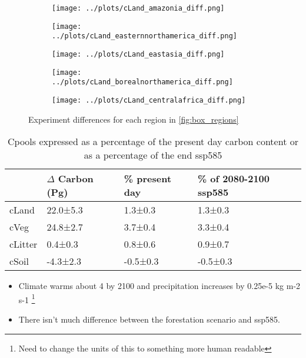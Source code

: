 \documentclass[]{article}
\begin{document}
\begin{figure}[H]
    \centering
    \begin{subfigure}[b]{0.4\linewidth}
        \texttt{[image: ../plots/cLand\_amazonia\_diff.png]}
    \end{subfigure}

    \begin{subfigure}[b]{0.4\linewidth}
        \texttt{[image: ../plots/cLand\_easternnorthamerica\_diff.png]}
    \end{subfigure}
    \begin{subfigure}[b]{0.4\linewidth}
        \texttt{[image: ../plots/cLand\_eastasia\_diff.png]}
    \end{subfigure}
    \begin{subfigure}[b]{0.4\linewidth}
        \texttt{[image: ../plots/cLand\_borealnorthamerica\_diff.png]}
    \end{subfigure}
    \begin{subfigure}[b]{0.4\linewidth}
        \texttt{[image: ../plots/cLand\_centralafrica\_diff.png]}
    \end{subfigure}
    \caption{Experiment differences for each region in \ref{fig:box_regions}}
    \label{fig:aus_region_cveg_tas}
\end{figure}

\begin{table}[H]
    \centering
    \begin{tabular}{@{}llll@{}}
    \hline
        & $\Delta$ Carbon (Pg) & \% present day & \% of 2080-2100 ssp585 \\ \hline
cLand   & 22.0±5.3    & 1.3±0.3        & 1.3±0.3                \\
cVeg    & 24.8±2.7    & 3.7±0.4        & 3.3±0.4                \\
cLitter & 0.4±0.3     & 0.8±0.6        & 0.9±0.7                \\
cSoil   & -4.3±2.3    & -0.5±0.3       & -0.5±0.3               \\ \hline
    \end{tabular}
    \caption{Cpools expressed as a percentage of the present day carbon content or  as a percentage of the end  ssp585}
    \label{tab:cpools_table}
\end{table}


\begin{itemize}
    \item Climate warms about 4 \textcelsius{} by 2100 and precipitation increases by 0.25e-5 kg m-2 s-1 \footnote{Need to change the units of this to something more human readable}
    \item There isn't much difference between the forestation scenario and ssp585.
\end{itemize}
\end{document}

